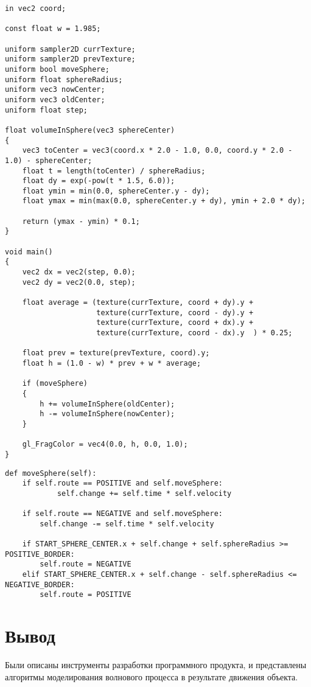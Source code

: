 \begin{center}
\captionsetup{justification=raggedright,singlelinecheck=off}
\begin{lstlisting}[label=lst:wave,caption=Алгоритм образования волн при движении предмета]
in vec2 coord;

const float w = 1.985;

uniform sampler2D currTexture;
uniform sampler2D prevTexture;
uniform bool moveSphere;
uniform float sphereRadius;
uniform vec3 nowCenter;
uniform vec3 oldCenter;
uniform float step;

float volumeInSphere(vec3 sphereCenter)
{
    vec3 toCenter = vec3(coord.x * 2.0 - 1.0, 0.0, coord.y * 2.0 - 1.0) - sphereCenter;
    float t = length(toCenter) / sphereRadius;
    float dy = exp(-pow(t * 1.5, 6.0));
    float ymin = min(0.0, sphereCenter.y - dy);
    float ymax = min(max(0.0, sphereCenter.y + dy), ymin + 2.0 * dy);

    return (ymax - ymin) * 0.1;
}

void main()
{
    vec2 dx = vec2(step, 0.0);
    vec2 dy = vec2(0.0, step);

    float average = (texture(currTexture, coord + dy).y +
                     texture(currTexture, coord - dy).y +
                     texture(currTexture, coord + dx).y +
                     texture(currTexture, coord - dx).y  ) * 0.25;

    float prev = texture(prevTexture, coord).y;
    float h = (1.0 - w) * prev + w * average;

    if (moveSphere)
    {
        h += volumeInSphere(oldCenter);
        h -= volumeInSphere(nowCenter);
    }

    gl_FragColor = vec4(0.0, h, 0.0, 1.0);
}
\end{lstlisting}
\end{center}

\begin{center}
\captionsetup{justification=raggedright,singlelinecheck=off}
\begin{lstlisting}[label=lst:sphere,caption=Алгоритм перемещения сферы]
def moveSphere(self):
	if self.route == POSITIVE and self.moveSphere:
    		self.change += self.time * self.velocity
        
	if self.route == NEGATIVE and self.moveSphere:
		self.change -= self.time * self.velocity

	if START_SPHERE_CENTER.x + self.change + self.sphereRadius >= POSITIVE_BORDER:
		self.route = NEGATIVE
	elif START_SPHERE_CENTER.x + self.change - self.sphereRadius <= NEGATIVE_BORDER:
		self.route = POSITIVE
\end{lstlisting}
\end{center}

\section*{Вывод}

Были описаны инструменты разработки программного продукта, и представлены алгоритмы моделирования волнового процесса в результате движения объекта.